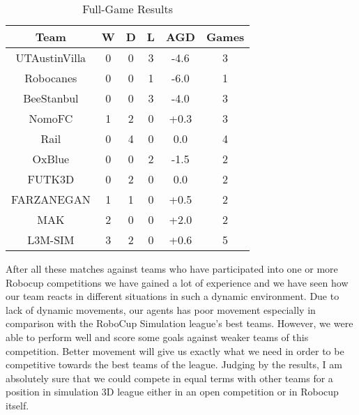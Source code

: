 \begin{table}
\begin{center}
    \begin{tabular}{ | c | c | c | c | c | c | }
    \hline
    \textbf{Team} 	& \textbf{W} & \textbf{D} & \textbf{L} & \textbf{AGD}\footnotemark 	& \textbf{Games}   \\ \hline
    UTAustinVilla 	& 0		& 0		& 3		& -4.6 		& 3 			\\ \hline	
    Robocanes 		& 0		& 0		& 1		& -6.0		& 1 			\\ \hline
    BeeStanbul		& 0		& 0		& 3		& -4.0		& 3				\\ \hline
    NomoFC 			& 1		& 2		& 0		& +0.3 		& 3 			\\ \hline
    Rail 			& 0		& 4		& 0		& 0.0 		& 4 			\\ \hline
    OxBlue 			& 0		& 0		& 2		& -1.5 		& 2 			\\ \hline
    FUTK3D 			& 0		& 2		& 0		& 0.0 		& 2 			\\ \hline
    FARZANEGAN 		& 1		& 1		& 0		& +0.5 		& 2 			\\ \hline
    MAK 			& 2		& 0		& 0		& +2.0 		& 2 			\\ \hline
    L3M-SIM			& 3		& 2 	& 0		& +0.6 		& 5 			\\     
    \hline
    \end{tabular}
\end{center}
\label{GameResults}
\caption{Full-Game Results}
\end{table}




After all these matches against teams who have participated into one or more Robocup competitions we have gained a lot of experience and we have seen how our team reacts in different situations in such a dynamic environment. Due to lack of dynamic movements, our agents has poor movement especially in comparison with the RoboCup Simulation league's best teams. However, we were able to perform well and score some goals against weaker teams of this competition. Better movement will give us exactly what we need in order to be competitive towards the best teams of the league. Judging by the results, I am absolutely sure that we could compete in equal terms with other teams for a position in simulation 3D league either in an open competition or in Robocup itself.

